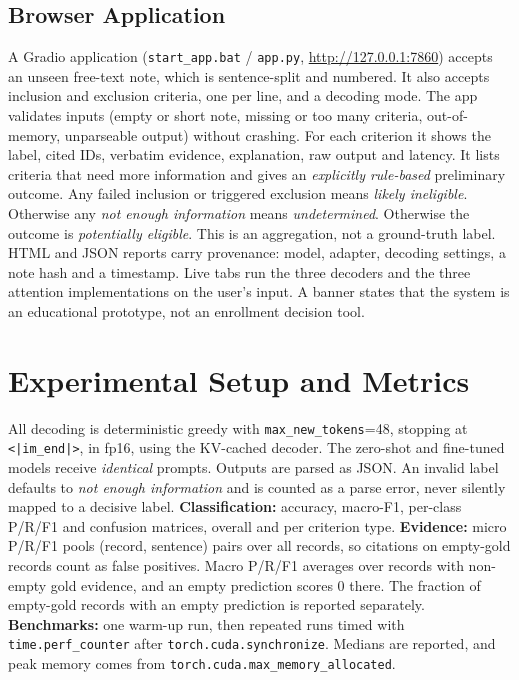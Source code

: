 \documentclass[conference]{IEEEtran}
\begin{document}
\subsection{Browser Application}
A Gradio application (\texttt{start\_app.bat} / \texttt{app.py}, \url{http://127.0.0.1:7860}) accepts an unseen
free-text note, which is sentence-split and numbered. It also accepts inclusion and exclusion criteria,
one per line, and a decoding mode. The app validates inputs (empty or short note, missing or too many
criteria, out-of-memory, unparseable output) without crashing. For each criterion it shows the label,
cited IDs, verbatim evidence, explanation, raw output and latency. It lists criteria that need more
information and gives an \emph{explicitly rule-based} preliminary outcome. Any failed inclusion or
triggered exclusion means \emph{likely ineligible}. Otherwise any \emph{not enough information} means
\emph{undetermined}. Otherwise the outcome is \emph{potentially eligible}. This is an aggregation, not a
ground-truth label. HTML and JSON reports carry provenance: model, adapter, decoding settings, a note hash
and a timestamp. Live tabs run the three decoders and the three attention implementations on the user's
input. A banner states that the system is an educational prototype, not an enrollment decision tool.

\section{Experimental Setup and Metrics}
All decoding is deterministic greedy with \texttt{max\_new\_tokens}=48, stopping at
\texttt{<|im\_end|>}, in fp16, using the KV-cached decoder. The zero-shot and fine-tuned models receive
\emph{identical} prompts. Outputs are parsed as JSON. An invalid label defaults to
\emph{not enough information} and is counted as a parse error, never silently mapped to a decisive label.
\textbf{Classification:} accuracy, macro-F1, per-class P/R/F1 and confusion matrices, overall and per
criterion type. \textbf{Evidence:} micro P/R/F1 pools (record, sentence) pairs over all records, so
citations on empty-gold records count as false positives. Macro P/R/F1 averages over records with
non-empty gold evidence, and an empty prediction scores 0 there. The fraction of empty-gold records with
an empty prediction is reported separately. \textbf{Benchmarks:} one warm-up run, then repeated runs timed
with \texttt{time.perf\_counter} after \texttt{torch.cuda.synchronize}. Medians are reported, and peak
memory comes from \texttt{torch.cuda.max\_memory\_allocated}.
\end{document}
